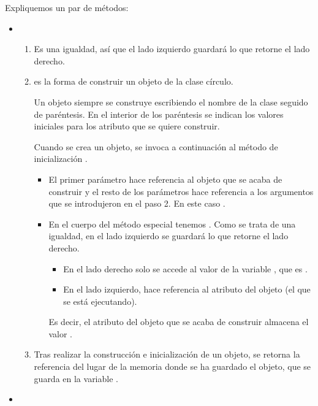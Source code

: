 Expliquemos un par de métodos:

\begin{itemize}
\item {}
	\begin{enumerate}
	\item 
	Es una igualdad, así que el lado izquierdo guardará lo que retorne el lado derecho.
	
	\item
	 es la forma de construir un objeto de la clase círculo. 
	
	Un objeto siempre se construye escribiendo el nombre de la clase seguido de paréntesis. En el interior de los paréntesis se indican los valores iniciales para los atributo que se quiere construir.
	
	Cuando se crea un objeto, se invoca a continuación al método de inicialización .
	\begin{itemize}
	\item
	El primer parámetro hace referencia al objeto que se acaba de construir y el resto de los parámetros hace referencia a los argumentos que se introdujeron en el paso 2. En este caso .
	
	\item
	En el cuerpo del método especial tenemos . Como se trata de una igualdad, en el lado izquierdo se guardará lo que retorne el lado derecho.
	
	\begin{itemize}
	\item 
	En el lado derecho solo se accede al valor de la variable , que es .
	
	\item
	En el lado izquierdo,  hace referencia al atributo  del objeto  (el que se está ejecutando).
	\end{itemize}
	
	Es decir, el atributo  del objeto que se acaba de construir almacena el valor . 
	\end{itemize}
	
	\item Tras realizar la construcción e inicialización de un objeto, se retorna la referencia del lugar de la memoria donde se ha guardado el objeto, que se guarda en la variable .
	\end{enumerate}

	
\item {}


\end{itemize}
